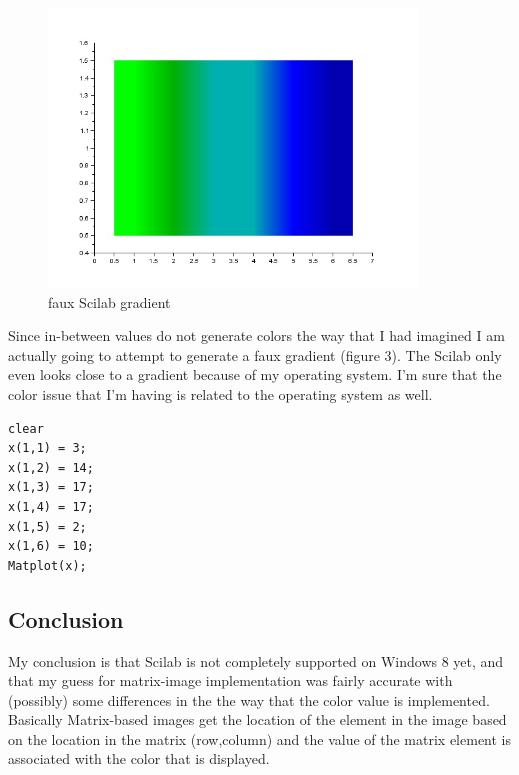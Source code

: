 \begin{figure}
\centering
\includegraphics[height=20em]{ScilabGrad}
\caption{faux Scilab gradient}
\end{figure}

Since in-between values do not generate colors the way that I had imagined I am actually going to attempt to generate a faux gradient (figure 3). The Scilab only even looks close to a gradient because of my operating system. I'm sure that the color issue that I'm having is related to the operating system as well.

\begin{lstlisting}[caption=faux gradient]
clear
x(1,1) = 3;
x(1,2) = 14;
x(1,3) = 17;
x(1,4) = 17;
x(1,5) = 2;
x(1,6) = 10;
Matplot(x);
\end{lstlisting}

\subsection{Conclusion}
My conclusion is that Scilab is not completely supported on Windows 8 yet, and that my guess for matrix-image implementation was fairly accurate with (possibly) some differences in the the way that the color value is implemented. Basically Matrix-based images get the location of the element in the image based on the location in the matrix (row,column) and the value of the matrix element is associated with the color that is displayed.

